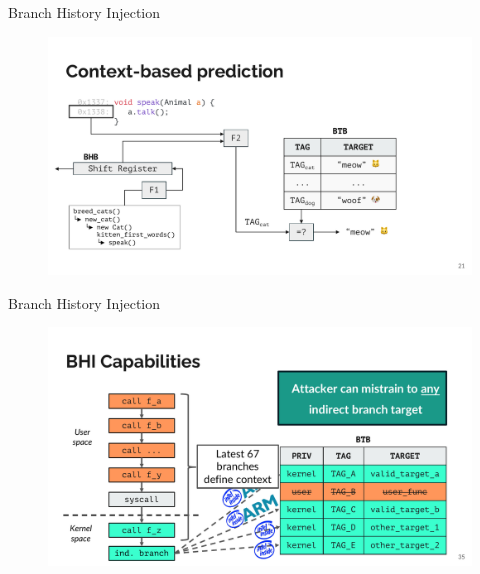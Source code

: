 \documentclass{beamer}
\begin{document}
\begin{frame}{Branch History Injection\cite{bhi}}
    \begin{figure}
        \begin{center}
            \includegraphics[width=1\textwidth]{img/context.pdf}
        \end{center}
    \end{figure} 
\end{frame}

\begin{frame}{Branch History Injection\cite{bhi}}
    \begin{figure}
        \begin{center}
            \includegraphics[width=1\textwidth]{img/capability.pdf}
        \end{center}
    \end{figure} 
\end{frame}
\end{document}
